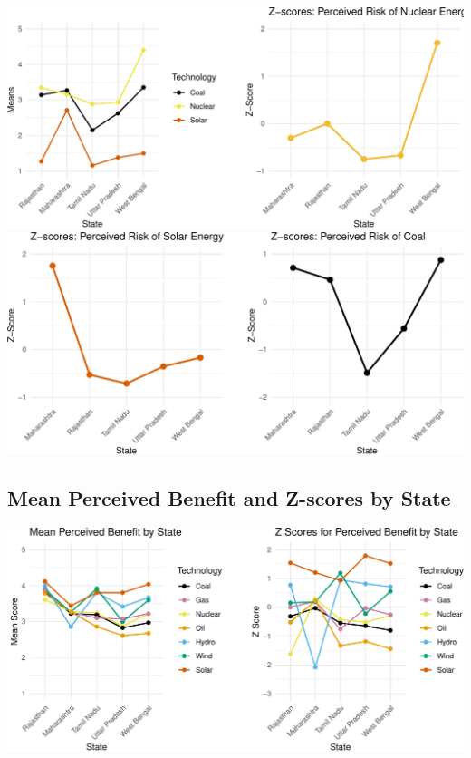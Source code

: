 \documentclass[
]{article}
\begin{document}
\includegraphics{nuclear-in-comparison_files/figure-latex/unnamed-chunk-34-1.pdf}
\includegraphics{nuclear-in-comparison_files/figure-latex/unnamed-chunk-34-2.pdf}

\newpage

\hypertarget{mean-perceived-benefit-and-z-scores-by-state}{%
\subsection{Mean Perceived Benefit and Z-scores by
State}\label{mean-perceived-benefit-and-z-scores-by-state}}

\includegraphics[width=1\linewidth,height=1\textheight]{nuclear-in-comparison_files/figure-latex/unnamed-chunk-37-1}
\end{document}
